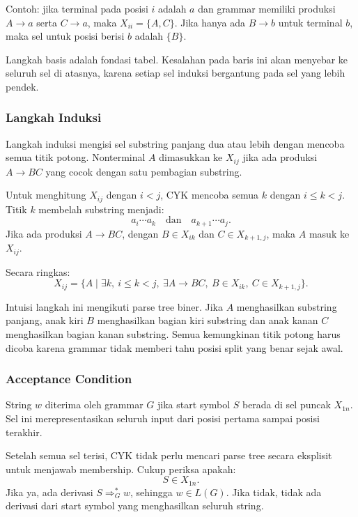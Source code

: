 Contoh: jika terminal pada posisi $i$ adalah $a$ dan grammar memiliki produksi $A\rightarrow a$ serta $C\rightarrow a$, maka $X_{ii}=\{A,C\}$. Jika hanya ada $B\rightarrow b$ untuk terminal $b$, maka sel untuk posisi berisi $b$ adalah $\{B\}$.

Langkah basis adalah fondasi tabel. Kesalahan pada baris ini akan menyebar ke seluruh sel di atasnya, karena setiap sel induksi bergantung pada sel yang lebih pendek.

\subsubsection{Langkah Induksi}

\begin{jawab}
Langkah induksi mengisi sel substring panjang dua atau lebih dengan mencoba semua titik potong. Nonterminal $A$ dimasukkan ke $X_{ij}$ jika ada produksi $A\rightarrow BC$ yang cocok dengan satu pembagian substring.
\end{jawab}

Untuk menghitung $X_{ij}$ dengan $i<j$, CYK mencoba semua $k$ dengan $i\leq k<j$. Titik $k$ membelah substring menjadi:
\[
    a_i\cdots a_k
    \quad \text{dan} \quad
    a_{k+1}\cdots a_j.
\]
Jika ada produksi $A\rightarrow BC$, dengan $B\in X_{ik}$ dan $C\in X_{k+1,j}$, maka $A$ masuk ke $X_{ij}$.

Secara ringkas:
\[
    X_{ij}=\{A\mid \exists k,\ i\leq k<j,\ \exists A\rightarrow BC,\ B\in X_{ik},\ C\in X_{k+1,j}\}.
\]

Intuisi langkah ini mengikuti parse tree biner. Jika $A$ menghasilkan substring panjang, anak kiri $B$ menghasilkan bagian kiri substring dan anak kanan $C$ menghasilkan bagian kanan substring. Semua kemungkinan titik potong harus dicoba karena grammar tidak memberi tahu posisi split yang benar sejak awal.

\subsubsection{Acceptance Condition}

\begin{jawab}
String $w$ diterima oleh grammar $G$ jika start symbol $S$ berada di sel puncak $X_{1n}$. Sel ini merepresentasikan seluruh input dari posisi pertama sampai posisi terakhir.
\end{jawab}

Setelah semua sel terisi, CYK tidak perlu mencari parse tree secara eksplisit untuk menjawab membership. Cukup periksa apakah:
\[
    S\in X_{1n}.
\]
Jika ya, ada derivasi $S\Rightarrow_G^* w$, sehingga $w\in L(G)$. Jika tidak, tidak ada derivasi dari start symbol yang menghasilkan seluruh string.

